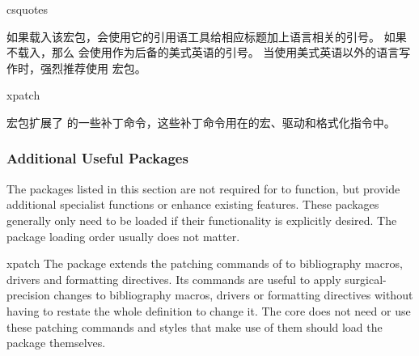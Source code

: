 \begin{marglist}
\item[csquotes]

如果载入该宏包，\biblatex 会使用它的引用语工具给相应标题加上语言相关的引号。
如果不载入，那么 \biblatex 会使用作为后备的美式英语的引号。
当使用美式英语以外的语言写作时，强烈推荐使用  宏包。

\item[xpatch]

 宏包扩展了  的一些补丁命令，这些补丁命令用在\biblatex 的宏、驱动和格式化指令中。

\end{marglist}

\subsubsection{Additional Useful Packages}
\label{int:pre:add}

The packages listed in this section are not required for \biblatex to function, but provide additional specialist functions or enhance existing features. These packages generally only need to be loaded if their functionality is explicitly desired. The package loading order usually does not matter.

\begin{marglist}

\item[xpatch]
The  package extends the patching commands of  to \biblatex bibliography macros, drivers and formatting directives. Its commands are useful to apply surgical-precision changes to bibliography macros, drivers or formatting directives without having to restate the whole definition to change it. The \biblatex core does not need or use these patching commands and styles that make use of them should load the package themselves.

\end{marglist}

